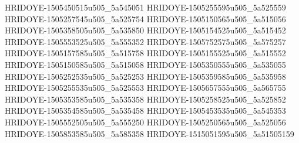 HRIDOYE-1505450515u505_5a545051
HRIDOYE-1505255595u505_5a525559
HRIDOYE-1505257545u505_5a525754
HRIDOYE-1505150565u505_5a515056
HRIDOYE-1505358505u505_5a535850
HRIDOYE-1505154525u505_5a515452
HRIDOYE-1505553525u505_5a555352
HRIDOYE-1505752575u505_5a575257
HRIDOYE-1505157585u505_5a515758
HRIDOYE-1505155525u505_5a515552
HRIDOYE-1505150585u505_5a515058
HRIDOYE-1505350555u505_5a535055
HRIDOYE-1505252535u505_5a525253
HRIDOYE-1505359585u505_5a535958
HRIDOYE-1505255535u505_5a525553
HRIDOYE-1505657555u505_5a565755
HRIDOYE-1505353585u505_5a535358
HRIDOYE-1505258525u505_5a525852
HRIDOYE-1505354585u505_5a535458
HRIDOYE-1505453535u505_5a545353
HRIDOYE-1505552505u505_5a555250
HRIDOYE-1505250565u505_5a525056
HRIDOYE-1505853585u505_5a585358
HRIDOYE-1515051595u505_5a51505159
